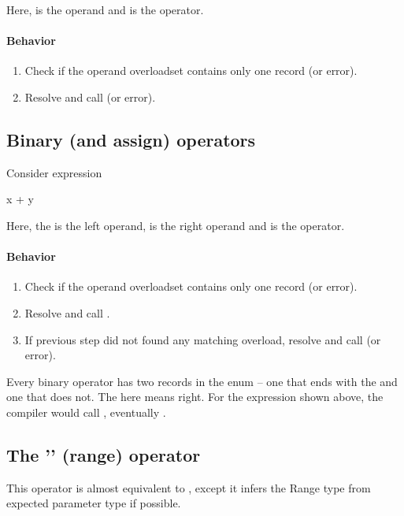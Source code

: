 Here,  is the operand and \inlineCode{++} is the operator.

\paragraph{Behavior}
\begin{enumerate}
	\item Check if the operand overloadset contains only one record (or error).
	\item Resolve and call  (or error).
\end{enumerate}

\subsection{Binary (and assign) operators}
Consider expression
\begin{code}
	x + y
\end{code}

Here, the  is the left operand,  is the right operand and \inlineCode{+} is the operator.

\paragraph{Behavior}
\begin{enumerate}
	\item Check if the operand overloadset contains only one record (or error).
	\item Resolve and call .
	\item If previous step did not found any matching overload, resolve and call  (or error).
\end{enumerate}

Every binary operator has two records in the  enum -- one that ends with the  and one that does not. The  here means right. For the expression shown above, the compiler would call , eventually .

\subsection{The '' (range) operator}
This operator is almost equivalent to , except it infers the Range type from expected parameter type if possible.

